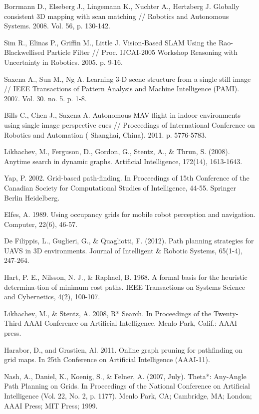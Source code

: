 \documentclass[review]{elsarticle}
\begin{document}
\begin{thebibliography}{9}
	 Borrmann D., Elseberg J., Lingemann K., Nuchter A., Hertzberg J. Globally consistent 3D mapping with scan matching // Robotics and Autonomous Systems. 2008. Vol. 56, p. 130-142.
	
	 Sim R., Elinas P., Griffin M., Little J. Vision-Based SLAM Using the Rao-Blackwellised Particle Filter // Proc. IJCAI-2005 Workshop Reasoning with Uncertainty in Robotics. 2005. p. 9-16.
	
	 Saxena A., Sun M., Ng A. Learning 3-D scene structure from a single still image // IEEE Transactions of Pattern Analysis and Machine Intelligence (PAMI). 2007. Vol. 30. no. 5. p. 1-8.
	
	 Bills C., Chen J.,  Saxena A. Autonomous MAV ﬂight in indoor environments using single image perspective cues // Proceedings of International Conference on Robotics and Automation ( Shanghai, China). 2011. p. 5776-5783.
	
	 Likhachev, M., Ferguson, D., Gordon, G., Stentz, A., \& Thrun, S. (2008). Anytime search in dynamic graphs. Artificial Intelligence, 172(14), 1613-1643.
	
	 Yap, P. 2002. Grid-based path-finding. In Proceedings of 15th Conference of the Canadian Society for Computational Studies of Intelligence, 44-55. Springer Berlin Heidelberg.
	
	 Elfes, A. 1989. Using occupancy grids for mobile robot perception and navigation. Computer, 22(6), 46-57.
	
	 De Filippis, L., Guglieri, G., \& Quagliotti, F. (2012). Path planning strategies for UAVS in 3D environments. Journal of Intelligent \& Robotic Systems, 65(1-4), 247-264.
	
	 Hart, P. E., Nilsson, N. J., \& Raphael, B. 1968. A formal basis for the heuristic determina-tion of minimum cost paths. IEEE Transactions on Systems Science and Cybernetics, 4(2), 100-107.
	
	 Likhachev, M., \& Stentz, A. 2008, R* Search. In Proceedings of the Twenty-Third AAAI Conference on Artificial Intelligence. Menlo Park, Calif.: AAAI press.
	
	 Harabor, D., and Grastien, Al. 2011. Online graph pruning for pathfinding on grid maps. In 25th Conference on Artificial Intelligence (AAAI-11).
	
	 Nash, A., Daniel, K., Koenig, S., \& Felner, A. (2007, July). Theta*: Any-Angle Path Planning on Grids. In Proceedings of the National Conference on Artificial Intelligence (Vol. 22, No. 2, p. 1177). Menlo Park, CA; Cambridge, MA; London; AAAI Press; MIT Press; 1999.
	

\end{thebibliography}
\end{document}
